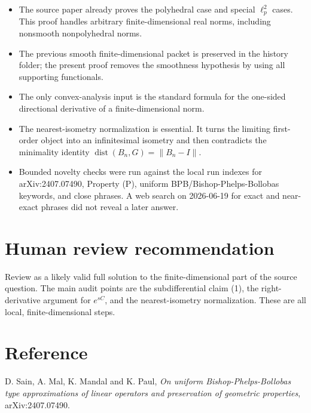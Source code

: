 \documentclass[11pt]{article}
\newcommand{\dist}{\operatorname{dist}}
\newcommand{\norm}[1]{\left\lVert #1 \right\rVert}
\begin{document}
\begin{itemize}
\item The source paper already proves the polyhedral case and special
  \(\ell_p^2\) cases.  This proof handles arbitrary finite-dimensional real
  norms, including nonsmooth nonpolyhedral norms.
\item The previous smooth finite-dimensional packet is preserved in the
  history folder; the present proof removes the smoothness
  hypothesis by using all supporting functionals.
\item The only convex-analysis input is the standard formula for the one-sided
  directional derivative of a finite-dimensional norm.
\item The nearest-isometry normalization is essential.  It turns the limiting
  first-order object into an infinitesimal isometry and then contradicts the
  minimality identity \(\dist(B_n,G)=\norm{B_n-I}\).
\item Bounded novelty checks were run against the local run indexes for
  arXiv:2407.07490, Property (P), uniform BPB/Bishop-Phelps-Bollobas keywords,
  and close phrases.  A web search on 2026-06-19 for exact and near-exact
  phrases did not reveal a later answer.
\end{itemize}

\section*{Human review recommendation}

Review as a likely valid full solution to the finite-dimensional part of the
source question.  The main audit points are the subdifferential claim (1), the
right-derivative argument for \(e^{sC}\), and the nearest-isometry
normalization.  These are all local, finite-dimensional steps.

\section*{Reference}

D. Sain, A. Mal, K. Mandal and K. Paul, \emph{On uniform
Bishop-Phelps-Bollobas type approximations of linear operators and preservation
of geometric properties}, arXiv:2407.07490.
\end{document}

